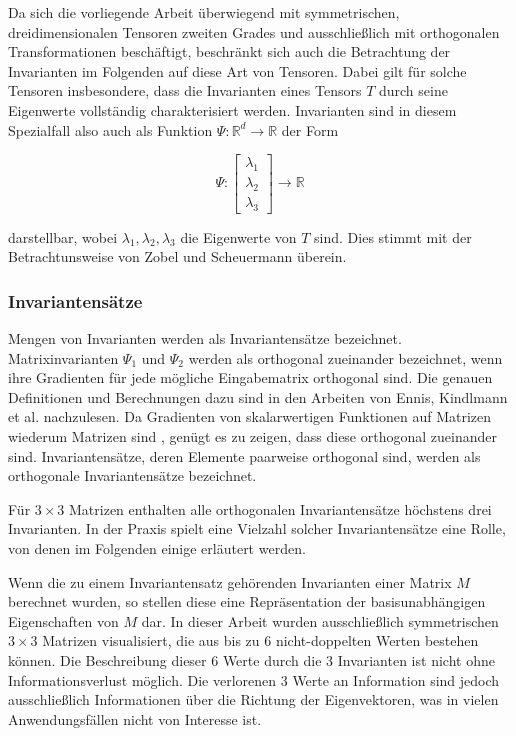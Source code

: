 \documentclass[a4paper,fontsize=12pt,toc=bib,parskip=half,ngerman]{scrartcl}
\begin{document}
Da sich die vorliegende Arbeit \"uberwiegend mit symmetrischen, dreidimensionalen Tensoren zweiten Grades und ausschlie{\ss}lich mit orthogonalen Transformationen besch\"aftigt, beschr\"ankt sich auch die Betrachtung der Invarianten im Folgenden auf diese Art von Tensoren. Dabei gilt f\"ur solche Tensoren insbesondere, dass die Invarianten eines Tensors $T$ durch seine Eigenwerte vollst\"andig charakterisiert werden. Invarianten sind in diesem Spezialfall also auch als Funktion $\Psi: \mathbb{R}^d \rightarrow \mathbb{R}$ der Form

\begin{equation}
	\Psi:
	\begin{bmatrix}
	\lambda_1\\
	\lambda_2\\
	\lambda_3
	\end{bmatrix}
	\rightarrow \mathbb{R}
\end{equation}

darstellbar, wobei $\lambda_1, \lambda_2, \lambda_3$ die Eigenwerte von $T$ sind. Dies stimmt mit der Betrachtunsweise von Zobel und Scheuermann \cite{zobel2017extremal} \"uberein.

\subsubsection{Invariantens\"atze} 
\label{sec:Invariants}
Mengen von Invarianten werden als Invariantens\"atze bezeichnet.
Matrixinvarianten $\Psi_1$ und $\Psi_2$ werden als orthogonal zueinander bezeichnet, wenn ihre Gradienten f\"ur jede m\"ogliche Eingabematrix orthogonal sind. Die genauen Definitionen und Berechnungen dazu sind in den Arbeiten von Ennis, Kindlmann et al. \cite{ennis2006orthogonal} nachzulesen. Da Gradienten von skalarwertigen Funktionen auf Matrizen wiederum Matrizen sind \cite[S.~137]{ennis2006orthogonal}, gen\"ugt es zu zeigen, dass diese orthogonal zueinander sind. Invariantens\"atze, deren Elemente paarweise orthogonal sind, werden als orthogonale Invariantens\"atze bezeichnet.

F\"ur $3\times 3$ Matrizen enthalten alle orthogonalen Invariantens\"atze h\"ochstens drei Invarianten. In der Praxis spielt eine Vielzahl solcher Invariantens\"atze eine Rolle, von denen im Folgenden einige erl\"autert werden.

Wenn die zu einem Invariantensatz geh\"orenden Invarianten einer Matrix $M$ berechnet wurden, so stellen diese eine Repr\"asentation der basisunabh\"angigen Eigenschaften von $M$ dar. In dieser Arbeit wurden ausschlie{\ss}lich symmetrischen $3\times3$ Matrizen visualisiert, die aus bis zu 6 nicht-doppelten Werten bestehen k\"onnen. Die Beschreibung dieser 6 Werte durch die 3 Invarianten ist nicht ohne Informationsverlust m\"oglich. Die verlorenen 3 Werte an Information sind jedoch ausschlie{\ss}lich Informationen \"uber die Richtung der Eigenvektoren, was in vielen Anwendungsf\"allen nicht von Interesse ist.
\end{document}
